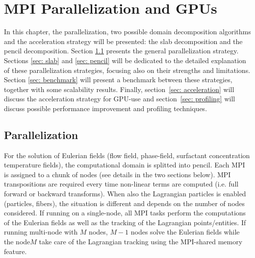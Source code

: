 \chapter{MPI Parallelization and GPUs}
\label{chap: dom_decomp}
In this chapter, the parallelization, two possible domain decomposition algorithms and the acceleration strategy will be presented: the slab decomposition and the pencil decomposition. Section \ref{sec: parallelization} presents the general parallelization strategy. 
Sections \ref{sec: slab} and \ref{sec: pencil} will be dedicated to the detailed explanation of these parallelization strategies, focusing also on their strengths and limitations. 
Section \ref{sec: benchmark} will present a benchmark between these strategies, together with some scalability results.
Finally, section~\ref{sec: acceleration} will discuss the acceleration strategy for GPU-use and section~\ref{sec: profiling} will discuss possible performance improvement and profiling techniques.


\section{Parallelization}
\label{sec: parallelization}
For the solution of Eulerian fields (flow field, phase-field, surfactant concentration temperature fields), the computational domain is splitted into pencil.
Each MPI is assigned to a chunk of nodes (see details in the two sections below). MPI transpositions are required every time non-linear terms are computed (i.e. full forward or backward transforms).
When also the Lagrangian particles is enabled (particles, fibers), the situation is different and depends on the number of nodes considered.
If running on a single-node, all MPI tasks perform the computations of the Eulerian fields as well as the tracking of the Lagrangian points/entities.
If running multi-node with $M$ nodes, $M-1$ nodes solve the Eulerian fields while the node$M$ take care of the Lagrangian tracking using the MPI-shared memory feature.



